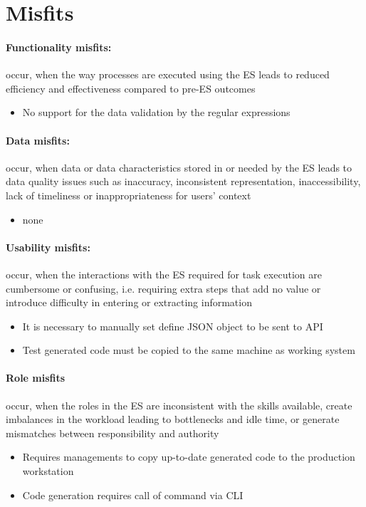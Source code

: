 \section{Misfits}
\paragraph{Functionality misfits:} occur, when the way processes are executed using the ES leads to reduced efficiency and effectiveness compared to pre-ES outcomes 
\begin{itemize}
	\item No support for the data validation by the regular expressions
\end{itemize}

\paragraph{Data misfits:}  occur, when data or data characteristics stored in or needed by the ES leads to data quality issues such as inaccuracy, inconsistent representation, inaccessibility, lack of timeliness or inappropriateness for users' context
\begin{itemize}
	\item none
\end{itemize}

\paragraph{Usability misfits:}  occur, when the interactions with the ES required for task execution are cumbersome or confusing, i.e. requiring extra steps that add no value or introduce difficulty in entering or extracting information 
\begin{itemize}
	\item It is necessary to manually set define JSON object to be sent to API
	\item Test generated code must be copied to the same machine as working system
\end{itemize}


\paragraph{Role misfits} occur, when the roles in the ES are inconsistent with the skills available, create imbalances in the workload leading to bottlenecks and idle time, or generate mismatches between responsibility and authority 
\begin{itemize}
	\item Requires managements to copy up-to-date generated code to the production workstation
	\item Code generation requires call of command via CLI
\end{itemize}

